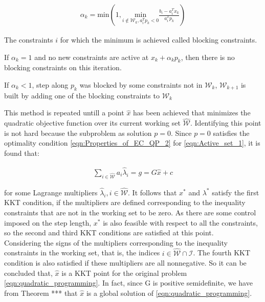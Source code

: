 \begin{equation}
	\begin{aligned}
		\alpha_k = {\text{min}} \left( 1, \underset{i\notin \mathcal{W}_k,a_i^Tp_k<0 }{\text{min}} \frac{b_i-a_i^Tx_k}{a_i^Tp_k} \right) 
	\end{aligned}
	\label{eqn:Active_set_3}
\end{equation}

The constraints $i$ for which the minimum is achieved called blocking constraints. 

If $\alpha_k = 1$ and no new constraints are active at $ x_k+\alpha_kp_k $, then there is no blocking constraints on this iteration. 

If $\alpha_k < 1$, step along $p_k$ was blocked by some constraints not in $\mathcal{W}_k$, $\mathcal{W}_{k+1}$ is built by adding one of the blocking constraints to $\mathcal{W}_k$

This method is repeated untill a point $\hat{x}$ has been achieved that minimizes the quadratic objective function over its current working set $\hat{\mathcal{W}}$. Identifying this point is not hard because the subproblem as solution $p=0$. Since $p=0$ satisfies the optimality condition \ref{eqn:Properties_of_EC_QP_2} for \ref{eqn:Active_set_1}, it is found that:

\begin{equation}
	\begin{aligned}
		\underset{i\in \hat{\mathcal{W}}}{\sum}a_i\hat{\lambda}_i = g = G\hat{x}+c
	\end{aligned}
	\label{eqn:Active_set_4}
\end{equation}

for some Lagrange multipliers $\hat{\lambda}_i,i \in \hat{\mathcal{W}}$.  It follows that $x^*$ and $\lambda^*$ satisfy the first KKT condition, if the multipliers are defined corresponding to the inequality constraints that are not in the working set to be zero. As there are some control imposed on the step length, $x^*$ is also feasible with respect to all the constraints, so the second and third KKT conditions are satisfied at this point.\\

Considering the signs of the multipliers corresponding to the inequality constraints in the working set, that is, the indices $i\in \hat{\mathcal{W}} \cap \mathcal{I}$. The fourth KKT condition is also satisfied if these multipliers are all nonnegative. So it can be concluded that, $\hat{x}$ is a KKT point for the original problem \ref{eqn:quadratic_programming}. In fact, since G is positive semidefinite, we have from Theorem *** that $\hat{x}$ is a global solution of \ref{eqn:quadratic_programming}.

